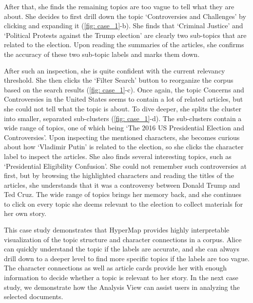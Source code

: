 After that, she finds the remaining topics are too vague to tell what they are about. 
She decides to first drill down the topic \textcolor{controversies_and_challenges}{`Controversies and Challenges'} by clicking and expanding it (\autoref{fig: case_1}-b).
She finds that \textcolor{criminal_justice}{`Criminal Justice'} and \textcolor{political_protests}{`Political Protests against the Trump election'} are clearly two sub-topics that are related to the election.
Upon reading the summaries of the articles, she confirms the accuracy of these two sub-topic labels and marks them down.

After such an inspection, she is quite confident with the current relevancy threshold. 
She then clicks the `Filter Search' button to reorganize the corpus based on the search results (\autoref{fig: case_1}-c).
Once again, the topic \textcolor{concerns_and_controversies}{Concerns and Controversies in the United States} seems to contain a lot of related articles, but she could not tell what the topic is about.
To dive deeper, she splits the cluster into smaller, separated sub-clusters (\autoref{fig: case_1}-d).
The sub-clusters contain a wide range of topics, one of which being \textcolor{presidential_election_and_controversies}{`The 2016 US Presidential Election and Controversies'}.
Upon inspecting the mentioned characters, she becomes curious about how `Vladimir Putin' is related to the election, so she clicks the character label to inspect the articles.
She also finds several interesting topics, such as \textcolor{presidential_eligibility}{`Presidential Eligibility Confusion'}.
She could not remember such controversies at first, but by browsing the highlighted characters and reading the titles of the articles, she understands that it was a controversy between Donald Trump and Ted Cruz.
The wide range of topics brings her memory back, and she continues to click on every topic she deems relevant to the election to collect materials for her own story.

This case study demonstrates that HyperMap provides highly interpretable visualization of the topic structure and character connections in a corpus. 
Alice can quickly understand the topic if the labels are accurate, and she can always drill down to a deeper level to find more specific topics if the labels are too vague.
The character connections as well as article cards provide her with enough information to decide whether a topic is relevant to her story.
In the next case study, we demonstrate how the Analysis View can assist users in analyzing the selected documents.

